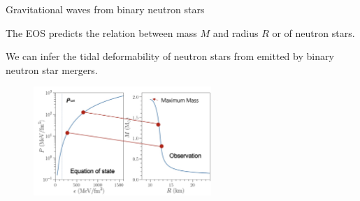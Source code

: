 \documentclass[usenames,dvipsnames,t]{beamer}
\begin{document}
\begin{frame}{Gravitational waves from binary neutron stars}

  \def\x{5mm}
  
  The EOS predicts the relation between mass $M$ and radius $R$ or  of neutron stars.

  \vspace{\x}

  We can infer the tidal deformability of neutron stars from  emitted by binary neutron star mergers.

  \vspace{\x}
  
  \begin{figure}
    \centering
    \includegraphics[width=0.60\textwidth]{Figures/ingo_eos_TOV_without_TOV.jpg}
    \caption*{}
  \end{figure}
  
  \end{frame}
\end{document}
